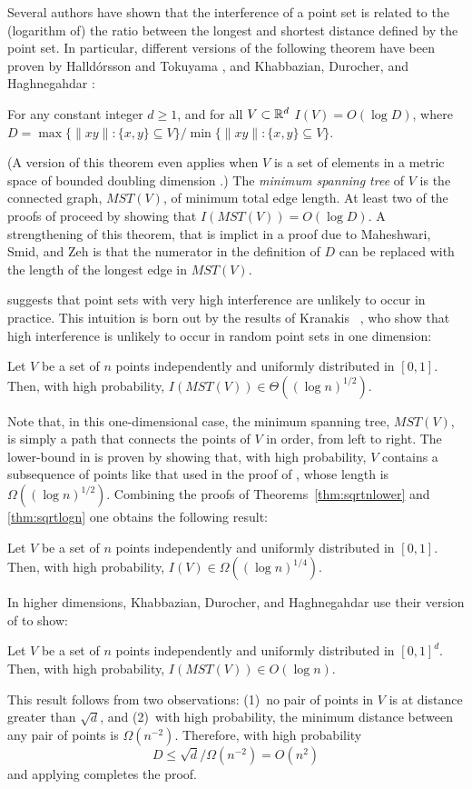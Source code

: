 \documentclass{patmorin}
\newcommand{\mst}{\mathit{MST}}
\begin{document}
Several authors have shown that the interference of a point set is
related to the (logarithm of) the ratio between the longest and shortest
distance defined by the point set.  In particular, different versions
of the following theorem have been proven by Halld\'orsson and Tokuyama
\cite{ht08}, and Khabbazian, Durocher, and Haghnegahdar
\cite{kdh11}:
\begin{thm}
  For any constant integer $d\ge 1$, and for all $V\subset\mathbb{R}^d$
  $I(V)=O(\log D)$, where $D=\max\{\|xy\|: \{x,y\}\subseteq V\}/\min\{\|xy\|:
  \{x,y\}\subseteq V\}$.
\end{thm}
(A version of this theorem even applies when $V$ is a set of elements
in a metric space of bounded doubling dimension \cite{msz11}.)  The
\emph{minimum spanning tree} of $V$ is the connected graph, $\mst(V)$,
of minimum total edge length.  At least two of the proofs of 
proceed by showing that $I(\mst(V))=O(\log D)$.  A strengthening of
this theorem, that is implict in a proof due to Maheshwari, Smid, and
Zeh \cite{msz11} is that the numerator in the definition of $D$ can be
replaced with the length of the longest edge in $\mst(V)$.

 suggests that point sets with very high interference are
unlikely to occur in practice.  This intuition is born out by the results
of Kranakis \etal\ \cite{kkmns10}, who show that high interference is
unlikely to occur in random point sets in one dimension:
\begin{thm}
  Let $V$ be a set of $n$ points independently and uniformly distributed
  in $[0,1]$.  Then, with high probability, $I(\mst(V))\in \Theta((\log
  n)^{1/2})$.
\end{thm}
Note that, in this one-dimensional case, the minimum spanning tree,
$\mst(V)$, is simply a path that connects the points of $V$ in order,
from left to right.  The lower-bound in  is proven
by showing that, with high probability, $V$ contains a subsequence
of points like that used in the proof of ,
whose length is $\Omega((\log n)^{1/2})$.  Combining the proofs of
Theorems~\ref{thm:sqrtnlower} and \ref{thm:sqrtlogn} one obtains the
following result:
\begin{thm}
  Let $V$ be a set of $n$ points independently and uniformly distributed
  in $[0,1]$.  Then, with high probability, $I(V)\in \Omega((\log
  n)^{1/4})$.
\end{thm}

In higher dimensions, Khabbazian, Durocher, and Haghnegahdar use their
version of  to show:
\begin{thm}
  Let $V$ be a set of $n$ points independently and uniformly distributed
  in $[0,1]^d$.  Then, with high probability, $I(\mst(V))\in O(\log n)$.
\end{thm}
This result follows from two observations: (1)~no pair of points in $V$
is at distance greater than $\sqrt{d}$, and (2)~with high probability,
the minimum distance between any pair of points is $\Omega(n^{-2})$.  Therefore,
with high probability
\[
   D \le \sqrt{d}/\Omega(n^{-2}) = O(n^2)
\]
and applying  completes the proof.
\end{document}
